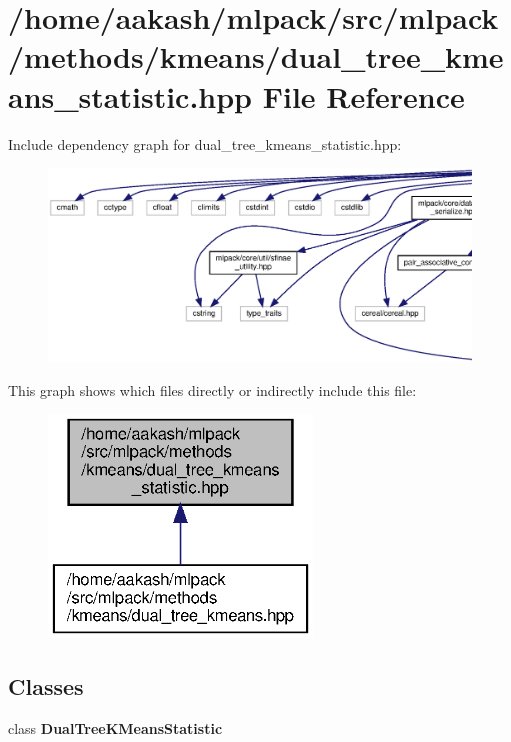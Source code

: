 \section{/home/aakash/mlpack/src/mlpack/methods/kmeans/dual\+\_\+tree\+\_\+kmeans\+\_\+statistic.hpp File Reference}
\label{dual__tree__kmeans__statistic_8hpp}
Include dependency graph for dual\+\_\+tree\+\_\+kmeans\+\_\+statistic.\+hpp\+:
\nopagebreak
\begin{figure}[H]
\begin{center}
\leavevmode
\includegraphics[width=350pt]{dual__tree__kmeans__statistic_8hpp__incl}
\end{center}
\end{figure}
This graph shows which files directly or indirectly include this file\+:
\nopagebreak
\begin{figure}[H]
\begin{center}
\leavevmode
\includegraphics[width=199pt]{dual__tree__kmeans__statistic_8hpp__dep__incl}
\end{center}
\end{figure}
\subsection*{Classes}
\begin{DoxyCompactItemize}
\item 
class \textbf{ Dual\+Tree\+K\+Means\+Statistic}
\end{DoxyCompactItemize}

